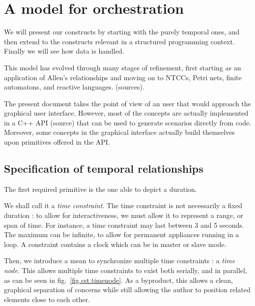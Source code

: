 \documentclass{sigchi}
\begin{document}
\section{A model for orchestration}
We will present our constructs by starting with the purely temporal ones, 
and then extend to the constructs relevant in a structured programming context.
Finally we will see how data is handled.

This model has evolved through many stages of refinement, first starting as an application of 
Allen's relationships and moving on to NTCCs, Petri nets, finite automatons, and reactive languages. (sources).

The present document takes the point of view of an user that would approach the graphical user interface. However, most of the concepts are actually implemented in a C++ API (source) that can be used to generate scenarios directly from code. Moreover, some concepts in the graphical interface actually build themselves upon primitives offered in the API.

\subsection{Specification of temporal relationships}\label{sec.temporal}
The first required primitive is the one able to depict a duration.

We shall call it a \textit{time constraint}.
The time constraint is not necessarily a fixed duration : to allow for interactiveness, 
we must allow it to represent a range, or span of time. For instance, a time constraint may last between 3 and 5 seconds. The maximum can be infinite, to allow for permanent appliances running in a loop. A constraint contains a clock which can be in master or slave mode.

Then, we introduce a mean to synchronize multiple time constraints : a \textit{time node}. 
This allows multiple time constraints to exist both serially, and in parallel, as can be seen in fig.~\ref{fig.cst.timenode}. 
As a byproduct, this allows a clean, graphical separation of concerns while still allowing the author to position related elements close to each other. %
\end{document}
